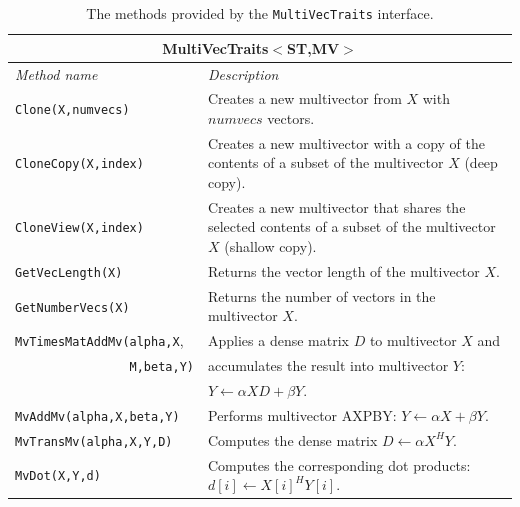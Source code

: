 \documentclass[acmtoms]{acmtrans2m}
\newcommand{\aspace}[1]{\texttt{#1}}
\begin{document}
\begin{table}
\begin{center}
  \caption{The methods provided by the \aspace{MultiVecTraits} interface.}
\label{tab:anasazi:mvt}
\begin{tabular}{| p{4cm} | p{8cm} |}
\hline
\multicolumn{2}{|c|}{\textbf{MultiVecTraits$<$ST,MV$>$}} \\\hline
\emph{Method name} & \emph{Description} \\\hline
{\tt Clone(X,numvecs)}           & Creates a new multivector from $X$ with
$numvecs$ vectors.  \\

{\tt CloneCopy(X,index)} & Creates a new multivector with a copy of the contents of
a subset of the multivector $X$ (deep copy). \\

{\tt CloneView(X,index)} & Creates a new multivector that shares the selected
contents of a subset of the multivector $X$ (shallow copy).  \\\hline

{\tt GetVecLength(X)} & Returns the vector length of the multivector $X$.
\\

{\tt GetNumberVecs(X)}& Returns the number of vectors in the multivector $X$.
\\\hline

{\tt MvTimesMatAddMv(alpha,X}, & Applies a dense matrix $D$ to multivector $X$ and \\ 
{\tt \ \ \ \ \ \ \ \ \ \ \ \ \ \ \ \ M,beta,Y)} & accumulates the result into multivector $Y$:\\ & $Y \leftarrow \alpha X D + \beta Y$.  \\

{\tt MvAddMv(alpha,X,beta,Y)}  & Performs multivector AXPBY: $Y \leftarrow \alpha X + \beta Y$.
\\

{\tt MvTransMv(alpha,X,Y,D)} & Computes the dense matrix $D \leftarrow \alpha X^H Y$.
\\

{\tt MvDot(X,Y,d)} & Computes the corresponding dot products:
$d[i] \leftarrow X[i]^H Y[i]$.  \\


\end{tabular}
\end{center}
\end{table}
\end{document}

